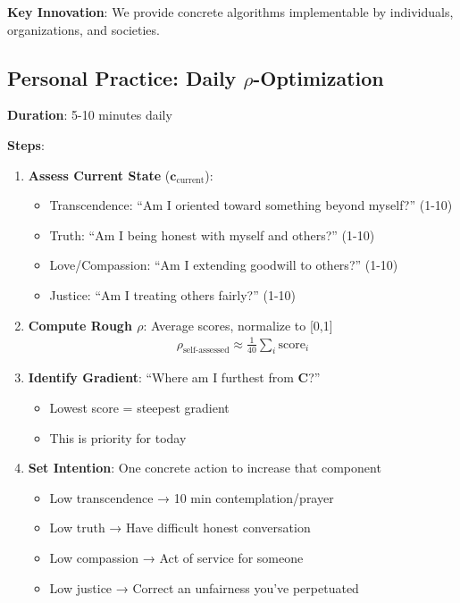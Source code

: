 \documentclass[11pt,a4paper]{article}
\theoremstyle{definition}
\theoremstyle{remark}
\newcommand{\cc}{\mathbf{c}}
\begin{document}
\begin{enumerate}
\begin{mdframed}[backgroundcolor=cyan!5,linewidth=2pt]
\textbf{Key Innovation}: We provide concrete algorithms implementable by individuals, organizations, and societies.
\end{mdframed}

\subsection{Personal Practice: Daily \(\rho\)-Optimization}

\begin{protocol}
\textbf{Duration}: 5-10 minutes daily

\textbf{Steps}:
\begin{enumerate}
    \item \textbf{Assess Current State} (\(\cc_{\text{current}}\)):
        \begin{itemize}[nosep]
            \item Transcendence: ``Am I oriented toward something beyond myself?'' (1-10)
            \item Truth: ``Am I being honest with myself and others?'' (1-10)
            \item Love/Compassion: ``Am I extending goodwill to others?'' (1-10)
            \item Justice: ``Am I treating others fairly?'' (1-10)
        \end{itemize}
    
    \item \textbf{Compute Rough \(\rho\)}: Average scores, normalize to [0,1]
    \begin{align}
    \rho_{\text{self-assessed}} \approx \frac{1}{40}\sum_i \text{score}_i
    \end{align}
    
    \item \textbf{Identify Gradient}: ``Where am I furthest from \(\mathbf{C}\)?''
        \begin{itemize}[nosep]
            \item Lowest score = steepest gradient
            \item This is priority for today
        \end{itemize}
    
    \item \textbf{Set Intention}: One concrete action to increase that component
        \begin{itemize}[nosep]
            \item Low transcendence → 10 min contemplation/prayer
            \item Low truth → Have difficult honest conversation
            \item Low compassion → Act of service for someone
            \item Low justice → Correct an unfairness you've perpetuated
        \end{itemize}
    

\end{enumerate}
\end{protocol}
\end{enumerate}
\end{document}

